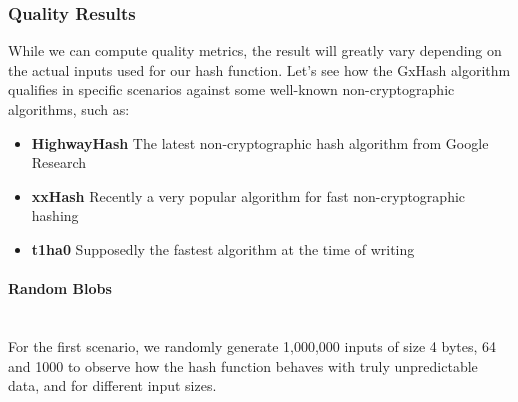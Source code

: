 \documentclass[10pt]{article}
\begin{document}
\subsubsection{Quality Results}

While we can compute quality metrics, the result will greatly vary depending on the actual inputs used for our hash function. Let's see how the GxHash algorithm qualifies in specific scenarios against some well-known non-cryptographic algorithms, such as:

\begin{itemize}
\item \textbf{HighwayHash}\cite{highwayhash} The latest non-cryptographic hash algorithm from Google Research
\item \textbf{xxHash}\cite{xxhash} Recently a very popular algorithm for fast non-cryptographic hashing
\item \textbf{t1ha0}\cite{rust-t1ha} Supposedly the fastest algorithm at the time of writing
\end{itemize}

\clearpage
\paragraph{Random Blobs}\leavevmode\\
For the first scenario, we randomly generate 1,000,000 inputs of size 4 bytes, 64 and 1000 to observe how the hash function behaves with truly unpredictable data, and for different input sizes.
\end{document}
